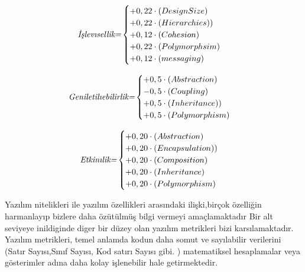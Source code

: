 \documentclass[conference]{IEEEtran}
\begin{document}
\begin{equation}
\textit{İşlev{\i}sellik=}
\begin{cases}
+0,22\cdot(Design Size) &  \\
+0,22\cdot(Hierarchies)) & \\
+0,12\cdot(Cohesion) &  \\
+0,22\cdot(Polymorphsim)& \\
+0,12\cdot(messaging) &  \\
\end{cases}
\label{equ:reuse}
\end{equation}

\begin{equation}
\textit{Geniletil{\i}ebilirlik=}
\begin{cases}
+0,5\cdot(Abstraction) &  \\
-0,5\cdot(Coupling) & \\
+0,5\cdot(Inheritance)) &  \\
+0,5\cdot(Polymorphism)& \\
\end{cases}
\label{equ:reuse}
\end{equation}

\begin{equation}
\textit{Etkin{\i}lik=}
\begin{cases}
+0,20\cdot(Abstraction) &  \\
+0,20\cdot(Encapsulation)) & \\
+0,20\cdot(Composition) &  \\
+0,20\cdot(Inheritance)& \\
+0,20\cdot(Polymorphism) &  \\
\end{cases}
\label{equ:reuse}
\end{equation}

Yazılım nitelikleri ile yazılım özellikleri arasındaki ilişki,birçok özelliğin harmanlayıp bizlere daha özütülmüş bilgi vermeyi amaçlamaktadır Bir alt seviyeye inildiginde diger bir düzey olan yazılım metrikleri bizi karsılamaktadır. Yazılım metrikleri, temel anlamda kodun daha somut ve sayılabilir verilerini (Satır Sayısı,Sınıf Sayısı, Kod satırı Sayısı gibi. ) matematiksel hesaplamalar veya gösterimler adına daha kolay işlenebilir hale getirmektedir.
\end{document}
